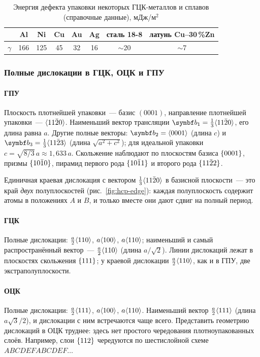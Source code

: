 \begin{table}[ht]
\centering
\caption{Энергия дефекта упаковки некоторых ГЦК-металлов и сплавов
(справочные данные), мДж/м$^2$}
\label{tab:sfe}
\small
\begin{tabular}{@{}lccccccc@{}}
\toprule
 & Al & Ni & Cu & Au & Ag & сталь 18-8 & латунь Cu--30\,\%Zn \\
\midrule
$\gamma$ & 166 & 125 & 45 & 32 & 16 & $\sim$20 & $\sim$7 \\
\bottomrule
\end{tabular}
\end{table}

\subsubsection{Полные дислокации в ГЦК, ОЦК и ГПУ}

\paragraph{ГПУ}
Плоскость плотнейшей упаковки~— базис $(0001)$, направление плотнейшей
упаковки~— $\langle 11\bar{2}0\rangle$. Наименьший вектор трансляции
$\vb b_1=\frac13\nfam{11\br20}$, его длина равна $a$. Другие полные
векторы: $\vb b_2=\nfam{0001}$ (длина $c$) и $\vb b_3=\frac13\nfam{11\br23}$
(длина $\sqrt{a^2+c^2}$); для идеальной упаковки $c=\sqrt{8/3}\,a\approx
1{,}633\,a$. Скольжение наблюдают по плоскостям базиса $\{0001\}$,
призмы $\{10\bar{1}0\}$, пирамид первого рода $\{10\bar{1}1\}$ и второго
рода $\{11\bar{2}2\}$.

Единичная краевая дислокация с вектором $\frac13\langle 11\bar{2}0\rangle$ в базисной
плоскости~— это край \emph{двух} полуплоскостей (рис.~\ref{fig:hcp-edge}):
каждая полуплоскость содержит атомы в положениях $A$ и $B$, и только
вместе они дают сдвиг на полный период.

\paragraph{ГЦК}
Полные дислокации: $\frac a2\langle 110\rangle$, $a\langle 100\rangle$, $a\langle 110\rangle$;
наименьший и самый распространённый вектор~— $\frac a2\langle 110\rangle$ (длина
$a/\sqrt2$). Линии дислокаций лежат в плоскостях скольжения $\{111\}$;
у краевой дислокации $\frac a2\langle 110\rangle$, как и в ГПУ, две
экстраполуплоскости.

\paragraph{ОЦК}
Полные дислокации: $\frac a2\langle 111\rangle$, $a\langle 100\rangle$, $a\langle 110\rangle$.
Наименьший вектор $\frac a2\langle 111\rangle$ (длина $a\sqrt3/2$), и дислокации с
ним встречаются чаще всего. Представить геометрию дислокаций в ОЦК
труднее: здесь нет простого чередования плотноупакованных слоёв.
Например, слои $\{112\}$ чередуются по шестислойной схеме
$ABCDEFABCDEF\ldots$

